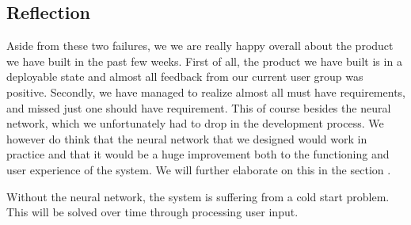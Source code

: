 \subsection{Reflection}
Aside from these two failures, we we are really happy overall about the product we have built in the past few weeks.
First of all, the product we have built is in a deployable state and almost all feedback from our current user group was positive.
Secondly, we have managed to realize almost all must have requirements, and missed just one should have requirement.
This of course besides the neural network, which we unfortunately had to drop in the development process.
We however do think that the neural network that we designed would work in practice and that it would be a huge improvement both to the functioning and user experience of the system.
We will further elaborate on this in the section .

Without the neural network, the system is suffering from a cold start problem.
This will be solved over time through processing user input.
